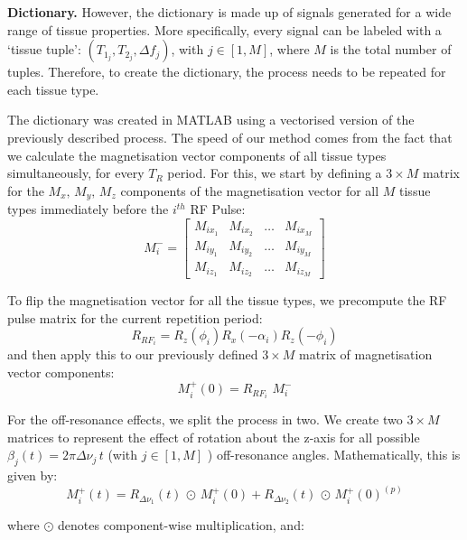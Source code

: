\textbf{Dictionary.} However, the dictionary is made up of signals generated for a wide range of tissue properties.
More specifically, every signal can be labeled with a `tissue tuple':
$(T_{1_j}, T_{2_j}, \Delta f_{j})$, with $j \in [1, M]$, where $M$ is the total number of tuples.
Therefore, to create the dictionary, the process needs to be repeated for each tissue type.

\hfill

The dictionary was created in MATLAB using a vectorised version of the previously described process.
The speed of our method comes from the fact that we calculate the magnetisation vector components of all tissue types simultaneously, for every $T_R$ period.
For this, we start by defining a $3 \times M$ matrix for the $M_x, \, M_y, \, M_z$ components of the magnetisation vector for all $M$ tissue types immediately before the $i^{th}$ RF Pulse:
\begin{equation}
    M^{-}_i = 
    \begin{bmatrix}
        M_{ix_1} & M_{ix_2} & \dots & M_{ix_M} \\
        M_{iy_1} & M_{iy_2} & \dots & M_{iy_M} \\
        M_{iz_1} & M_{iz_2} & \dots & M_{iz_M}
    \end{bmatrix}
\end{equation}

To flip the magnetisation vector for all the tissue types, we precompute the RF pulse matrix for the current repetition period:
\begin{equation}
        R_{RF_i} = R_{z}(\phi_i) R_{x}(-\alpha_i) R_{z}(-\phi_i)
\end{equation}
and then apply this to our previously defined $3 \times M$ matrix of magnetisation vector components:
\begin{equation}
    M^{+}_i(0) = R_{RF_i} \, \, M^{-}_i
\end{equation}

For the off-resonance effects, we split the process in two.
We create two $3 \times M$ matrices to represent the effect of rotation about the z-axis for all possible $\beta_j(t) = 2\pi \Delta \nu_j \, t$ \big(with $j \in [1, M]$ \big) off-resonance angles.
Mathematically, this is given by:
\begin{equation}
    M^{+}_i (t) = R_{\Delta \nu_1}(t) \, \odot \, M^{+}_i(0) + R_{\Delta \nu_2}(t)  \, \odot \, M^{+}_i(0)^{(p)}
\end{equation}

where $\odot$ denotes component-wise multiplication, and:

